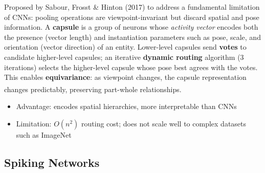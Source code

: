 \begin{tcbitemize}[ skin=sectionraster ]
    \tcbitem[title={Capsules and Dynamic Routing}, raster multicolumn=6]
    Proposed by Sabour, Frosst \& Hinton (2017) to address a fundamental limitation of CNNs: pooling operations are viewpoint-invariant but discard spatial and pose information.
    A \textbf{capsule} is a group of neurons whose \emph{activity vector} encodes both the presence (vector length) and instantiation parameters such as pose, scale, and orientation (vector direction) of an entity.
    Lower-level capsules send \textbf{votes} to candidate higher-level capsules; an iterative \textbf{dynamic routing} algorithm (3 iterations) selects the higher-level capsule whose pose best agrees with the votes.
    This enables \textbf{equivariance}: as viewpoint changes, the capsule representation changes predictably, preserving part-whole relationships\textsuperscript{\cite[][]{fleuretLittleBookDeep}}.
    \tcblower
    \begin{itemize}
        \item Advantage: encodes spatial hierarchies, more interpretable than CNNs
        \item Limitation: $O(n^2)$ routing cost; does not scale well to complex datasets such as ImageNet
    \end{itemize}
\end{tcbitemize}

\subsection{Spiking Networks}

